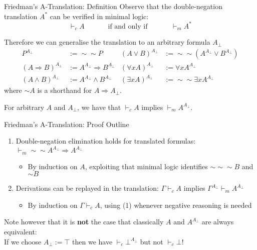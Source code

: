 \documentclass[xcolor=dvipsnames,aspectratio=169,handout]{beamer}
\renewcommand{\to}{\Rightarrow}
\begin{document}
\begin{frame}{Friedman's A-Translation: Definition}
	\pause
	Observe that the double-negation translation $A^*$ can be verified in minimal logic:
	$$\vdash_c A\hspace{3em}\text{ if and only if }\hspace{3em}\vdash_m A^{*}$$
	
	\pause
	Therefore we can generalise the translation to an arbitrary formula $A_\bot$
	\begin{align*}
		P^{A_\bot} &:= \sim\sim \!\! P & (A\lor B)^{A_\bot} &:=\sim\sim \!\! (A^{A_\bot}\lor B^{A_\bot})\\
		(A\to B)^{A_\bot} &:= A^{A_\bot}\to B^{A_\bot} & (\forall x A)^{A_\bot} &:=\forall  x A^{A_\bot}\\
		(A\land B)^{A_\bot} &:=A^{A_\bot}\land B^{A_\bot} & (\exists x A)^{A_\bot} & := \sim\sim \!\! \exists x A^{A_\bot}
	\end{align*}
	where $\sim \!\! A$ is a shorthand for $A\to A_\bot$.
		
	\pause
	\vspace{0.3cm}
	\pause
	\begin{theorem}[Friedman]
		For arbitrary $A$ and $A_\bot$, we have that $\vdash_c A$ implies $\vdash_m A^{A_\bot}$.
	\end{theorem}
\end{frame}

\begin{frame}{Friedman's A-Translation: Proof Outline}
	\begin{enumerate}
		\pause
		\item
		Double-negation elimination holds for translated formulas: $\vdash_m \sim\sim\!\! A^{A_\bot}\to A^{A_\bot}$
		\begin{itemize}
			\pause
			\item
			By induction on $A$, exploiting that minimal logic identifies $\sim\sim\sim\!\! B$ and $\sim\!\! B$
		\end{itemize}
		\vspace{0.7cm}
		\pause
		\item
		Derivations can be replayed in the translation: $\Gamma\vdash_c A$ implies $\Gamma^{A_\bot}\vdash_m A^{A_\bot}$
		\begin{itemize}
			\pause
			\item
			By induction on $\Gamma\vdash_c A$, using (1) whenever negative reasoning is needed
		\end{itemize}
	\end{enumerate}
	
	\pause
	\vspace{0.9cm}
	Note however that it is \textbf{not} the case that classically $A$ and $A^{A_\bot}$ are always equivalent:\\
	\pause
	If we choose ${A_\bot}:=\top$ then we have $\vdash_c \bot^{A_\bot}$ but not $\vdash_c \bot$!
\end{frame}
\end{document}
